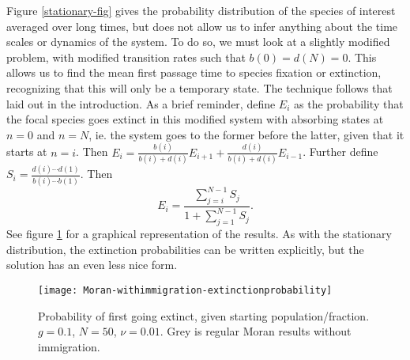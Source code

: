 Figure \ref{stationary-fig} gives the probability distribution of the species of interest averaged over long times, but does not allow us to infer anything about the time scales or dynamics of the system. 
To do so, we must look at a slightly modified problem, with modified transition rates such that $b(0)=d(N)=0$. 
This allows us to find the mean first passage time to species fixation or extinction, recognizing that this will only be a temporary state. 
The technique follows that laid out in the introduction. 
As a brief reminder, define $E_i$ as the probability that the focal species goes extinct in this modified system with absorbing states at $n=0$ and $n=N$, ie. the system goes to the former before the latter, given that it starts at $n=i$. 
Then $E_i = \frac{b(i)}{b(i)+d(i)}E_{i+1} + \frac{d(i)}{b(i)+d(i)}E_{i-1}$. 
Further define $S_i = \frac{d(i)\cdots d(1)}{b(i)\cdots b(1)}$. 
Then 
\begin{equation} \label{extnprob}
E_{i} = \frac{\sum_{j=i}^{N-1}S_j}{1+\sum_{j=1}^{N-1}S_j}. 
\end{equation}
See figure \ref{extnprobfig} for a graphical representation of the results. 
As with the stationary distribution, the extinction probabilities can be written explicitly, but the solution has an even less nice form. 
\begin{figure}[ht]
	\centering
	\texttt{[image: Moran-withimmigration-extinctionprobability]}
	\caption{Probability of first going extinct, given starting population/fraction. $g=0.1$, $N=50$, $\nu=0.01$. Grey is regular Moran results without immigration. } \label{extnprobfig}
\end{figure}

